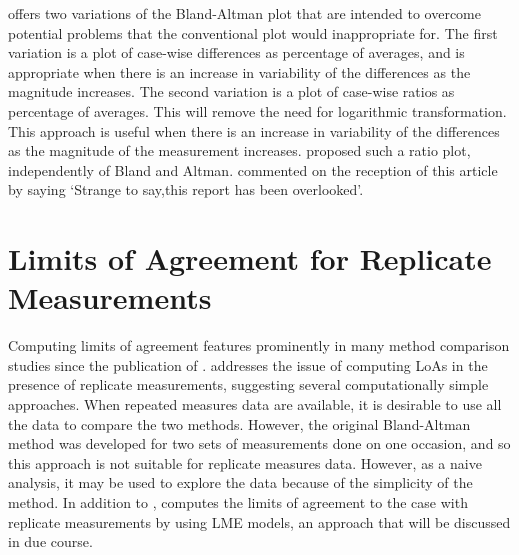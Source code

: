 \documentclass[12pt, a4paper]{report}
\theoremstyle{plain}
\theoremstyle{definition}
\theoremstyle{remark}
\begin{document}
\citet{BA99} offers two variations of the Bland-Altman plot that are intended to overcome potential problems that the conventional
plot would inappropriate for. The first variation is a plot of case-wise differences as percentage of averages, and is
appropriate when there is an increase in variability of the differences as the magnitude increases. The second variation is a
plot of case-wise ratios as percentage of averages. This will remove the need for logarithmic transformation. This approach is useful
when there is an increase in variability of the differences as the magnitude of the measurement increases. \citet{Eksborg} proposed
such a ratio plot, independently of Bland and Altman. \citet{Dewitte} commented on the reception of this article by saying `Strange to say,this report has been overlooked'.
	
	
\section{Limits of Agreement for Replicate Measurements}

Computing limits of agreement features prominently in many method comparison studies since the publication of \citet{BA86}.
\citet{BA99} addresses the issue of computing LoAs in the presence of replicate measurements, suggesting several computationally simple approaches. When repeated measures data are available, it is desirable to use
all the data to compare the two methods. However, the original Bland-Altman method was developed for two sets of measurements done on one occasion, and so this approach is not suitable for replicate measures data. However, as a naive analysis, it may be used to explore the data because of the simplicity of the method.
In addition to \citet{BA99}, \citet{BXC2008} computes the limits of agreement to the case with replicate measurements by using LME models, an approach that will be discussed in due course.
\end{document}
